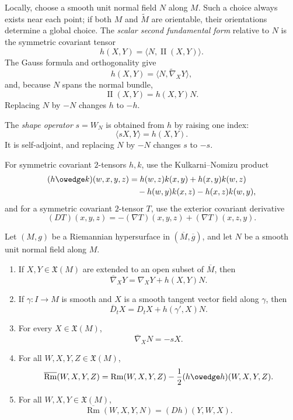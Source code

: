 Locally, choose a smooth unit normal field $N$ along $M$. Such a choice always
exists near each point; if both $M$ and $\widetilde M$ are orientable, their
orientations determine a global choice. The \emph{scalar second fundamental
form} relative to $N$ is the symmetric covariant tensor
\begin{equation}
h(X,Y)=\langle N,\operatorname{II}(X,Y)\rangle. \tag{8.8}
\end{equation}
The Gauss formula and orthogonality give
\begin{equation}
h(X,Y)=\langle N,\widetilde\nabla_XY\rangle, \tag{8.9}
\end{equation}
and, because $N$ spans the normal bundle,
\begin{equation}
\operatorname{II}(X,Y)=h(X,Y)N. \tag{8.10}
\end{equation}
Replacing $N$ by $-N$ changes $h$ to $-h$.

The \emph{shape operator} $s=W_N$ is obtained from $h$ by raising one index:
\[
\langle sX,Y\rangle=h(X,Y).
\]
It is self-adjoint, and replacing $N$ by $-N$ changes $s$ to $-s$.

For symmetric covariant $2$-tensors $h,k$, use the Kulkarni--Nomizu product
\begin{align*}
(h\owedge k)(w,x,y,z)
&=h(w,z)k(x,y)+h(x,y)k(w,z)\\
&\quad-h(w,y)k(x,z)-h(x,z)k(w,y),
\end{align*}
and for a symmetric covariant $2$-tensor $T$, use the exterior covariant
derivative
\[
(DT)(x,y,z)=-(\nabla T)(x,y,z)+(\nabla T)(x,z,y).
\]

\begin{theorem}
\label{thm:fundamental-equations-hypersurface}
Let $(M,g)$ be a Riemannian hypersurface in $(\overline M,\overline g)$, and
let $N$ be a smooth unit normal field along $M$.
\begin{enumerate}
\item[(a)] If $X,Y\in\mathfrak X(M)$ are extended to an open subset of
$\overline M$, then
\[
\overline\nabla_XY=\nabla_XY+h(X,Y)N.
\]
\item[(b)] If $\gamma\colon I\to M$ is smooth and $X$ is a smooth tangent
vector field along $\gamma$, then
\[
\overline D_tX=D_tX+h(\gamma',X)N.
\]
\item[(c)] For every $X\in\mathfrak X(M)$,
\begin{equation}
\overline\nabla_XN=-sX. \tag{8.11}
\end{equation}
\item[(d)] For all $W,X,Y,Z\in\mathfrak X(M)$,
\[
\overline{\operatorname{Rm}}(W,X,Y,Z)
=\operatorname{Rm}(W,X,Y,Z)-\frac12(h\owedge h)(W,X,Y,Z).
\]
\item[(e)] For all $W,X,Y\in\mathfrak X(M)$,
\begin{equation}
\overline{\operatorname{Rm}}(W,X,Y,N)=(Dh)(Y,W,X). \tag{8.12}
\end{equation}
\end{enumerate}
\end{theorem}

